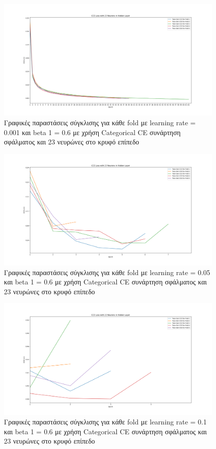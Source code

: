 \documentclass[12pt,a4paper]{article}
\begin{document}
\begin{figure}[H]
	\includegraphics[width=\textwidth]{Screenshots/25. LR 0.001 - Beta1 0.6.png}
	\caption{Γραφικές παραστάσεις σύγκλισης για κάθε fold με learning rate = 0.001 και beta 1 = 0.6 με χρήση Categorical CE συνάρτηση σφάλματος και 23 νευρώνες στο κρυφό επίπεδο}
\end{figure}

\begin{figure}[H]
	\includegraphics[width=\textwidth]{Screenshots/26. LR 0.05 - Beta1 0.6.png}
	\caption{Γραφικές παραστάσεις σύγκλισης για κάθε fold με learning rate = 0.05 και beta 1 = 0.6 με χρήση Categorical CE συνάρτηση σφάλματος και 23 νευρώνες στο κρυφό επίπεδο}
\end{figure}

\begin{figure}[H]
	\includegraphics[width=\textwidth]{Screenshots/27. LR 0.1 - Beta1 0.6.png}
	\caption{Γραφικές παραστάσεις σύγκλισης για κάθε fold με learning rate = 0.1 και beta 1 = 0.6 με χρήση Categorical CE συνάρτηση σφάλματος και 23 νευρώνες στο κρυφό επίπεδο}
\end{figure}
\end{document}
